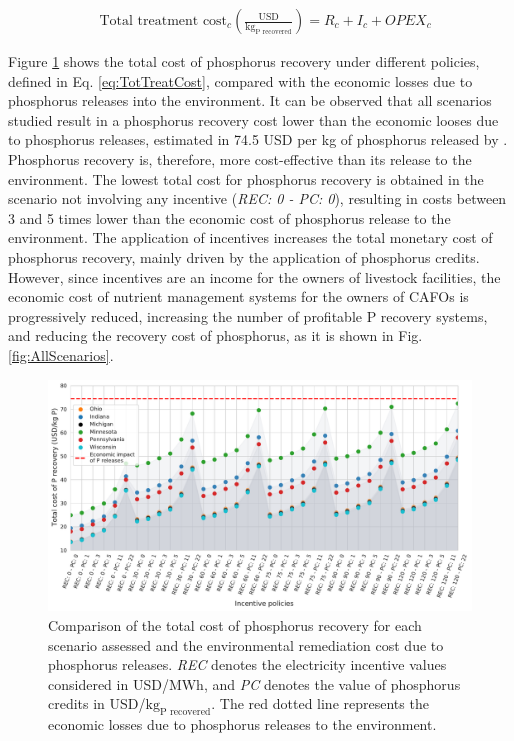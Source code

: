 \begin{refsection}[referencesCh5]
\begin{align}
& \text{Total treatment cost}_{c} \left(\frac{\text{USD}}{\text{kg}_{\text{P recovered}}}\right) = R_{c} + I_{c} + OPEX_{c} \label{eq:TotTreatCost}
\end{align}

Figure \ref{fig:plot_scenarios} shows the total cost of phosphorus recovery under different policies, defined in Eq. \ref{eq:TotTreatCost}, compared with the economic losses due to phosphorus releases into the environment. It can be observed that all scenarios studied result in a phosphorus recovery cost lower than the economic looses due to phosphorus releases, estimated in 74.5 USD per kg of phosphorus released by \citet{Sampat2020}. Phosphorus recovery is, therefore, more cost-effective than its release to the environment. The lowest total cost for phosphorus recovery is obtained in the scenario not involving any incentive (\textit{REC: 0 - PC: 0}), resulting in costs between 3 and 5 times lower than the economic cost of phosphorus release to the environment. The application of incentives increases the total monetary cost of phosphorus recovery, mainly driven by the application of phosphorus credits. However, since incentives are an income for the owners of livestock facilities, the economic cost of nutrient management systems for the owners of CAFOs is progressively reduced, increasing the number of profitable P recovery systems, and reducing the recovery cost of phosphorus, as it is shown in Fig. \ref{fig:AllScenarios}.

\begin{figure}[h]
	\centering
	\includegraphics[width=\linewidth]{gfx/Chapter5/TotalCost_kgPRecoveredAllStatesv2.pdf} 
	
	\caption{Comparison of the total cost of phosphorus recovery for each scenario assessed and the environmental remediation cost due to phosphorus releases. \textit{REC} denotes the electricity incentive values considered in USD/MWh, and \textit{PC} denotes the value of phosphorus credits in USD/${\text{kg}_\text{P recovered}}$. The red dotted line represents the economic losses due to phosphorus releases to the environment.}
	\label{fig:plot_scenarios}
\end{figure}


\end{refsection}
